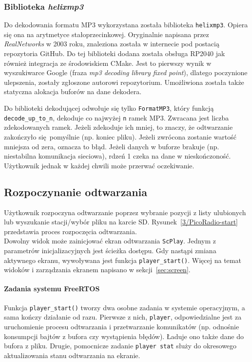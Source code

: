 \documentclass[polish]{aghengthesis}
\begin{document}
		\subsubsection{Biblioteka \textit{helixmp3}}
			Do dekodowania formatu MP3 wykorzystana została biblioteka \lstinline|helixmp3|. Opiera się ona na arytmetyce stałoprzecinkowej. Oryginalnie napisana przez \textit{RealNetworks}\textsuperscript{\cite{realnetworks}} w 2003 roku, znaleziona została w internecie pod postacią repozytoria GitHub\textsuperscript{\cite{helixmp3_repo}}. Do tej biblioteki dodana została obsługa RP2040 jak również integracja ze środowiskiem CMake. Jest to pierwszy wynik w wyszukiwarce Google (fraza \textit{mp3 decoding library fixed point}), dlatego poczynione ulepszenia, zostały zgłoszone autorowi repozytorium\textsuperscript{\cite{helixmp3_pr}}. Umożliwiona została także statyczna alokacja buforów na dane dekodera.
			
			Do biblioteki dekodującej odwołuje się tylko \lstinline|FormatMP3|, który funkcją \lstinline|decode_up_to_n|, dekoduje co najwyżej \lstinline|n| ramek MP3. Zwracana jest liczba zdekodowanych ramek. Jeżeli zdekoduje ich mniej, to znaczy, że odtwarzanie zakończyło się pomyślnie (np. koniec pliku). Jeżeli zwrócona zostanie wartość mniejsza od zera, oznacza to błąd. Jeżeli danych w buforze brakuje (np. niestabilna komunikacja sieciowa), rdzeń 1 czeka na dane w nieskończoność. Użytkownik jednak w każdej chwili może przerwać oczekiwanie.
		
		\subsection{Rozpoczynanie odtwarzania}
			Użytkownik rozpoczyna odtwarzanie poprzez wybranie pozycji z listy ulubionych lub wyszukanie stacji/wybór pliku na karcie SD.
			Rysunek~\ref{3/PicoRadio-start} przedstawia proces rozpoczęcia odtwarzania.
			$ $\\
			
			Dowolny widok może zainicjować ekran odtwarzania \lstinline|ScPlay|.
			Jednym z parametrów inicjalizacyjnych jest ścieżka dostępu. Gdy nastąpi zmiana aktywnego ekranu, wywoływana jest funkcja \lstinline|player_start()|. Więcej na temat widoków i zarządzania ekranem napisano w sekcji~\ref{sec:screen}.
			
			\paragraph{Zadania systemu FreeRTOS}
				Funkcja \lstinline|player_start()| tworzy dwa osobne zadania w systemie operacyjnym, a sama kończy działanie od razu. Pierwsze z nich, \lstinline|player|, odpowiedzialne jest za uruchomienie procesu odtwarzania i przetwarzanie komunikatów (np. odnośnie konsumpcji bajtów z bufora czy wystąpienia błędów). Ładuje ono także dane do bufora z pliku. Drugie, pomocnicze zadanie \lstinline|player stat| służy do okresowego aktualizowania stanu odtwarzania na ekranie.
			
\end{document}
